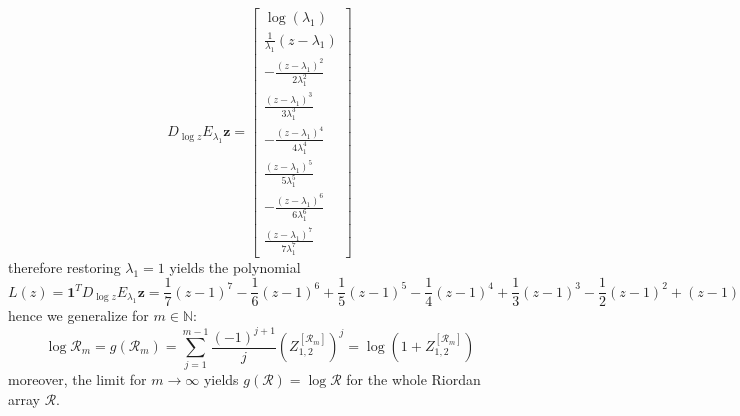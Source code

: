 \begin{displaymath}
D_{\log{z}}E_{\lambda_{1}}\boldsymbol{z} = \left[\begin{matrix}\log{\left (\lambda_{1} \right )}\\\frac{1}{\lambda_{1}} \left(z - \lambda_{1}\right)\\- \frac{\left(z - \lambda_{1}\right)^{2}}{2 \lambda_{1}^{2}}\\\frac{\left(z - \lambda_{1}\right)^{3}}{3 \lambda_{1}^{3}}\\- \frac{\left(z - \lambda_{1}\right)^{4}}{4 \lambda_{1}^{4}}\\\frac{\left(z - \lambda_{1}\right)^{5}}{5 \lambda_{1}^{5}}\\- \frac{\left(z - \lambda_{1}\right)^{6}}{6 \lambda_{1}^{6}}\\\frac{\left(z - \lambda_{1}\right)^{7}}{7 \lambda_{1}^{7}}\end{matrix}\right]
\end{displaymath}
therefore restoring $\lambda_{1}=1$ yields the polynomial
\begin{displaymath}
L{\left (z \right )} = \boldsymbol{1}^{T}D_{\log{z}}E_{\lambda_{1}}\boldsymbol{z} = \frac{1}{7} \left(z - 1\right)^{7} - \frac{1}{6} \left(z - 1\right)^{6} + \frac{1}{5} \left(z - 1\right)^{5} - \frac{1}{4} \left(z - 1\right)^{4} + \frac{1}{3} \left(z - 1\right)^{3} - \frac{1}{2} \left(z - 1\right)^{2} + (z - 1)
\end{displaymath}
hence we generalize for $m\in\mathbb{N}$:
\begin{displaymath}
\log{\mathcal{R}_{m}} = g{\left (\mathcal{R}_{m} \right )} = \sum_{j=1}^{m-1}{\frac{(-1)^{j+1}}{j}{\left(Z_{1,2}^{[\mathcal{R}_{m}]}\right)^{j} }} = \log{\left(1 + Z_{1,2}^{[\mathcal{R}_{m}]}\right)}
\end{displaymath}
moreover, the limit for $m \rightarrow \infty$ yields $ g{\left (\mathcal{R} \right )} = \log{\mathcal{R}} $ for the whole Riordan array $\mathcal{R}$.
\fi
